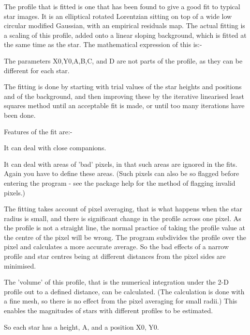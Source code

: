 \begin{small}
{{ The profile that is fitted is one that has been found to give a good fit
 to typical star images. It is an elliptical rotated Lorentzian sitting
 on top of a wide low circular modified Gaussian, with an empirical
 residuals map. The actual fitting is a scaling of this profile, added
 onto a linear sloping background, which is fitted at the same time as
 the star.  The mathematical expression of this is:-
 
 
 
 
 The parameters X0,Y0,A,B,C, and D are not parts of the profile, as
 they can be different for each star.
 
 The fitting is done by starting with trial values of the star heights
 and positions and of the background, and then improving these by the
 iterative linearised least squares method until an acceptable fit is
 made, or until too many iterations have been done.
 
 Features of the fit are:-
 
\begin{list}{{-}}{}
\item It can deal with close companions.
\item It can deal with areas of 'bad' pixels, in that such areas are
     ignored in the fits. Again you have to define these areas. (Such
     pixels can also be so flagged before entering the program - see
     the \starman package help for the method of flagging invalid
     pixels.)
\end{list}
 
  The fitting takes account of pixel averaging, that is what happens
  when the star radius is small, and there is significant change in
  the profile across one pixel. As the profile is not a straight line,
  the normal practice of taking the profile value at the centre of the
  pixel will be wrong. The program subdivides the profile over the
  pixel and calculates a more accurate average. So the bad effects of
  a narrow profile and star centres being at different distances from
  the pixel sides are minimised.
 
  The 'volume' of this profile, that is the numerical integration under
  the 2-D profile out to a defined distance, can be calculated. (The
  calculation is done with a fine mesh, so there is no effect from the
  pixel averaging for small radii.) This enables the magnitudes of
  stars with different profiles to be estimated.
 
 
   So each star has a height, A, and a position X0, Y0.
 
}}
\end{small}
